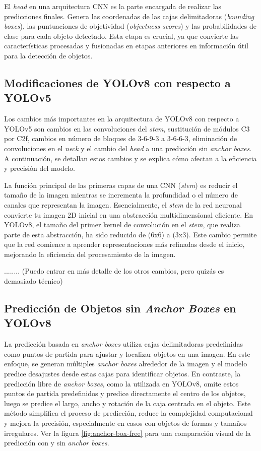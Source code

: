 El \textit{head} en una arquitectura CNN es la parte encargada de realizar las predicciones finales. Genera las coordenadas de las cajas delimitadoras (\textit{bounding boxes}), las puntuaciones de objetividad (\textit{objectness scores}) y las probabilidades de clase para cada objeto detectado. Esta etapa es crucial, ya que convierte las características procesadas y fusionadas en etapas anteriores en información útil para la detección de objetos.

\subsection{Modificaciones de YOLOv8 con respecto a YOLOv5}
Los cambios más importantes en la arquitectura de YOLOv8 con respecto a YOLOv5 son cambios en las convoluciones del \textit{stem}, sustitución de módulos C3 por C2f, cambios en número de bloques de 3-6-9-3 a 3-6-6-3, eliminación de convoluciones en el \textit{neck} y el cambio del \textit{head} a una predicción sin \textit{anchor boxes}. A continuación, se detallan estos cambios y se explica cómo afectan a la eficiencia y precisión del modelo.

La función principal de las primeras capas de una CNN (\textit{stem}) es reducir el tamaño de la imagen mientras se incrementa la profundidad o el número de canales que representan la imagen. Esencialmente, el \textit{stem} de la red neuronal convierte tu imagen 2D inicial en una abstracción multidimensional eficiente. En YOLOv8, el tamaño del primer kernel de convolución en el \textit{stem}, que realiza parte de esta abstracción, ha sido reducido de (6x6) a (3x3). Este cambio permite que la red comience a aprender representaciones más refinadas desde el inicio, mejorando la eficiencia del procesamiento de la imagen.

........ (Puedo entrar en más detalle de los otros cambios, pero quizás es demasiado técnico)


\subsection{Predicción de Objetos sin \textit{Anchor Boxes} en YOLOv8}
La predicción basada en \textit{anchor boxes} utiliza cajas delimitadoras predefinidas como puntos de partida para ajustar y localizar objetos en una imagen. En este enfoque, se generan múltiples \textit{anchor boxes} alrededor de la imagen y el modelo predice desajustes desde estas cajas para identificar objetos. En contraste, la predicción libre de \textit{anchor boxes}, como la utilizada en YOLOv8, omite estos puntos de partida predefinidos y predice directamente el centro de los objetos, luego se predice el largo, ancho y rotación de la caja centrada en el objeto. Este método simplifica el proceso de predicción, reduce la complejidad computacional y mejora la precisión, especialmente en casos con objetos de formas y tamaños irregulares. Ver la figura \ref{fig:anchor-box-free} para una comparación visual de la predicción con y sin \textit{anchor boxes}.


